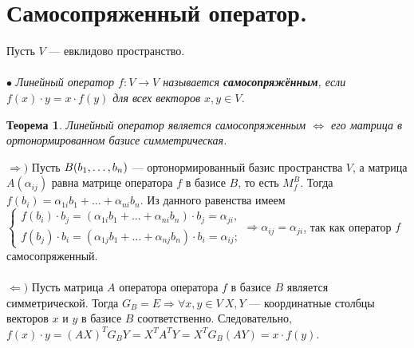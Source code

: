 \section{Самосопряженный оператор.}
Пусть $V$ --- евклидово пространство.\\\\
$\bullet$ \textit{Линейный оператор $f:{V \rightarrow V}$ называется \textbf{самосопряжённым}, если $f(x)\cdot y=x\cdot f(y)$ для всех векторов $x, y\in V$.}
\newtheorem*{th14_6_1}{Теорема}\begin{th14_6_1}Линейный оператор является самосопряженным $\Longleftrightarrow$ его матрица в ортонормированном базисе симметрическая.
\end{th14_6_1}\begin{Proof}
	$\Rightarrow)$ Пусть $B(b_1,\dots,b_n)$ --- ортонормированный базис пространства $V$, а матрица $A(\alpha_{ij})$ равна матрице оператора $f$ в базисе $B$, то есть $M_f^B$. Тогда $f(b_i)=\alpha_{1i}b_1+ \ldots +\alpha_{ni}b_n$. Из данного равенства имеем\\
	$\begin{cases}
		f(b_i)\cdot b_j=(\alpha_{1i}b_1+ \ldots +\alpha_{ni}b_n)\cdot b_j = \alpha_{ji},\\
		f(b_j)\cdot b_i=(\alpha_{1j}b_1+ \ldots +\alpha_{nj}b_n)\cdot b_i=\alpha_{ij};
	\end{cases}\Rightarrow \alpha_{ij} = \alpha_{ji}$, так как оператор $f$ самосопряженный.\\\\
	$\Leftarrow)$ Пусть матрица $A$ оператора оператора $f$ в базисе $B$ является симметрической. Тогда $G_B=E\Rightarrow\forall x,y\in V\ X,Y$ --- координатные столбцы векторов $x$ и $y$ в базисе $B$ соответственно. Следовательно, $f(x)\cdot y = (AX)^TG_BY = X^TA^TY = X^TG_B(AY) = x\cdot f(y)$.
\end{Proof}\\\\
